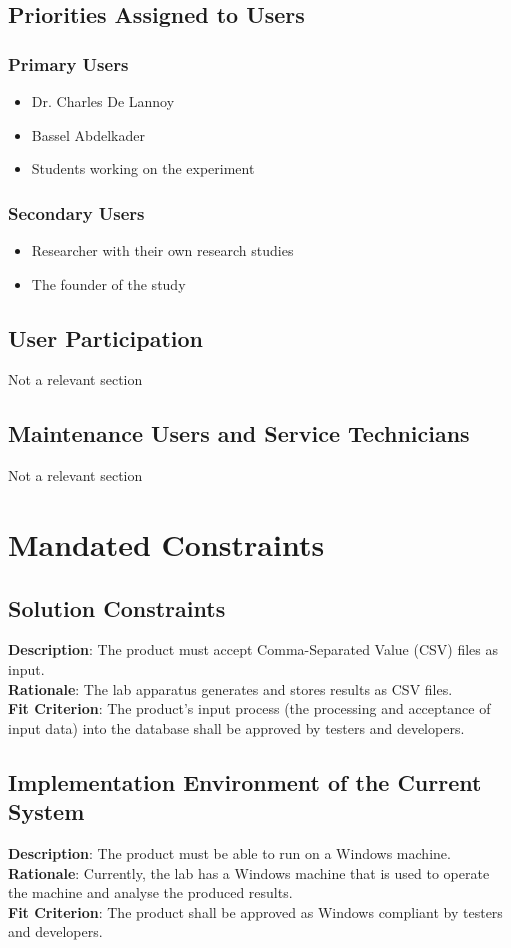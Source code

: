 \documentclass[12pt]{article}
\begin{document}
\subsection{Priorities Assigned to Users}
\subsubsection{Primary Users}
\begin{itemize}
  \item Dr. Charles De Lannoy
  \item Bassel Abdelkader
  \item Students working on the experiment 
\end{itemize}

\subsubsection{Secondary Users}
\begin{itemize}
  \item Researcher with their own research studies 
  \item The founder of the study
\end{itemize}
\subsection{User Participation}
Not a relevant section 
\subsection{Maintenance Users and Service Technicians}
Not a relevant section \section{Mandated Constraints}
\subsection{Solution Constraints}
\textbf{Description}: The product must accept Comma-Separated Value (CSV) files
as input.\\
\textbf{Rationale}: The lab apparatus generates and stores results as CSV
files.\\
\textbf{Fit Criterion}: The product's input process (the processing and
acceptance of input data) into the database shall be approved by testers and
developers.

\subsection{Implementation Environment of the Current System}
\textbf{Description}: The product must be able to run on a Windows machine.\\
\textbf{Rationale}: Currently, the lab has a Windows machine that is used to
operate the machine and analyse the produced results.\\
\textbf{Fit Criterion}: The product shall be approved as Windows compliant by
testers and developers.
\end{document}
